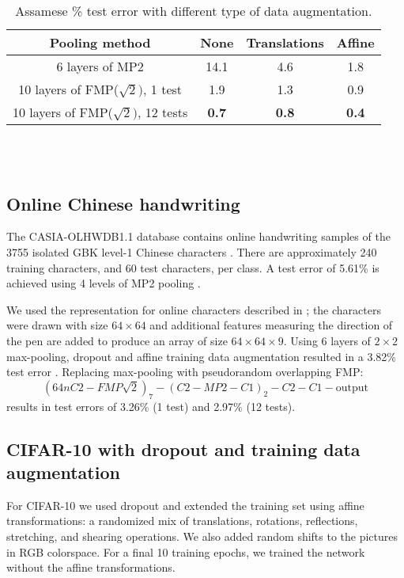 \documentclass[english]{article}
\begin{document}
\begin{table}
\centering{}\begin{tabular}{|c|ccc|}
\hline
Pooling method & None & Translations & Affine\\
\hline
6 layers of MP2 & 14.1 & 4.6 & 1.8\\
10 layers of FMP($\sqrt{2})$, 1 test & 1.9 & 1.3 & 0.9\\
10 layers of FMP($\sqrt{2})$, 12 tests & \textbf{0.7} & \textbf{0.8} & \textbf{0.4}\\
\hline
\end{tabular}
\ \\
\ \\
\caption{Assamese \% test error with different type of data augmentation.\label{tab:Assamese-=000025-test}}
\end{table}



\subsection{Online Chinese handwriting}

The CASIA-OLHWDB1.1 database contains online handwriting samples of
the 3755 isolated GBK level-1 Chinese characters \cite{CASIA}. There are approximately
240 training characters, and 60 test characters, per class. A test
error of 5.61\% is achieved using 4 levels of MP2 pooling \cite{multicolumndeep}.

We used the representation for online characters described in \cite{GrahamSparse}; the characters were drawn with size $64\times64$ and additional features measuring the direction of the pen are added to produce an array of size $64 \times 64 \times 9$. Using 6 layers of $2\times2$ max-pooling, dropout and affine training data augmentation
resulted in a 3.82\% test error \cite{GrahamSparse}.
Replacing max-pooling
with pseudorandom overlapping FMP:
\[
(64nC2-FMP\sqrt{2})_{7}-(C2-MP2-C1)_{2}-C2-C1-\mathrm{output}
\]
results in test errors of 3.26\% (1 test) and 2.97\% (12 tests).

\subsection{CIFAR-10 with dropout and training data augmentation}
For CIFAR-10 we used dropout and extended the training set using affine transformations: a randomized mix of translations,
rotations, reflections, stretching, and shearing operations.
We also added random shifts to the pictures in RGB colorspace. For a final 10 training epochs, we trained the network without the affine transformations.
\end{document}
